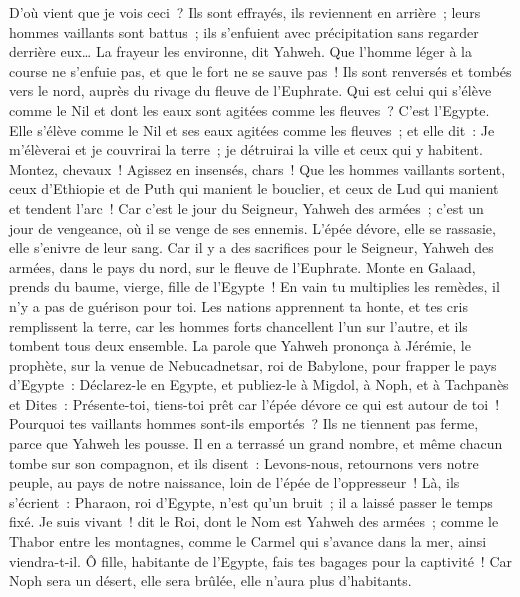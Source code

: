 \begin{multicols}{2}
D'où vient que je vois ceci~? Ils sont effrayés, ils reviennent en arrière~; leurs hommes vaillants sont battus~; ils s'enfuient avec précipitation sans regarder derrière eux… La frayeur les environne, dit Yahweh.
Que l'homme léger à la course ne s'enfuie pas, et que le fort ne se sauve pas~! Ils sont renversés et tombés vers le nord, auprès du rivage du fleuve de l'Euphrate.
Qui est celui qui s'élève comme le Nil et dont les eaux sont agitées comme les fleuves~?
C'est l'Egypte. Elle s'élève comme le Nil et ses eaux agitées comme les fleuves~; et elle dit~: Je m'élèverai et je couvrirai la terre~; je détruirai la ville et ceux qui y habitent.
Montez, chevaux~! Agissez en insensés, chars~! Que les hommes vaillants sortent, ceux d'Ethiopie et de Puth qui manient le bouclier, et ceux de Lud qui manient et tendent l'arc~!
Car c'est le jour du Seigneur, Yahweh des armées~; c'est un jour de vengeance, où il se venge de ses ennemis. L'épée dévore, elle se rassasie, elle s'enivre de leur sang. Car il y a des sacrifices pour le Seigneur, Yahweh des armées, dans le pays du nord, sur le fleuve de l'Euphrate.
Monte en Galaad, prends du baume, vierge, fille de l'Egypte~! En vain tu multiplies les remèdes, il n'y a pas de guérison pour toi.
Les nations apprennent ta honte, et tes cris remplissent la terre, car les hommes forts chancellent l'un sur l'autre, et ils tombent tous deux ensemble.
La parole que Yahweh prononça à Jérémie, le prophète, sur la venue de Nebucadnetsar, roi de Babylone, pour frapper le pays d'Egypte~:
Déclarez-le en Egypte, et publiez-le à Migdol, à Noph, et à Tachpanès et Dites~: Présente-toi, tiens-toi prêt car l'épée dévore ce qui est autour de toi~!
Pourquoi tes vaillants hommes sont-ils emportés~? Ils ne tiennent pas ferme, parce que Yahweh les pousse.
Il en a terrassé un grand nombre, et même chacun tombe sur son compagnon, et ils disent~: Levons-nous, retournons vers notre peuple, au pays de notre naissance, loin de l'épée de l'oppresseur~!
Là, ils s'écrient~: Pharaon, roi d'Egypte, n'est qu'un bruit~; il a laissé passer le temps fixé.
Je suis vivant~! dit le Roi, dont le Nom est Yahweh des armées~; comme le Thabor entre les montagnes, comme le Carmel qui s'avance dans la mer, ainsi viendra-t-il.
Ô fille, habitante de l'Egypte, fais tes bagages pour la captivité~! Car Noph sera un désert, elle sera brûlée, elle n'aura plus d'habitants.

\end{multicols}
